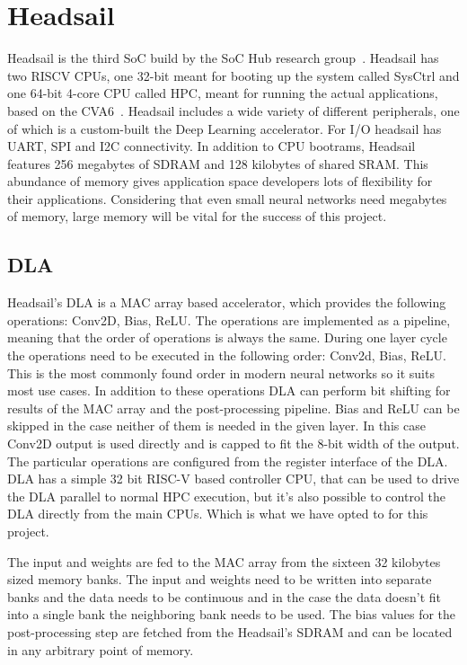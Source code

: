 \documentclass[12pt,a4paper,english
]{tunithesis}
\begin{document}
\section{Headsail}
Headsail is the third SoC build by the SoC Hub research group~\parencite{Ballast}. Headsail has two RISCV CPUs, one 32-bit meant for booting up the system called SysCtrl and one 64-bit 4-core CPU called HPC, meant for running the actual applications, based on the CVA6~\cite{zaruba2019costCVA6}.
Headsail includes a wide variety of different peripherals, one of which is a custom-built the Deep Learning accelerator.
For I/O headsail has UART, SPI and I2C connectivity.
In addition to CPU bootrams, Headsail features 256 megabytes of SDRAM and 128 kilobytes of shared SRAM. This abundance of memory gives application space developers lots of flexibility for their applications. Considering that even small neural networks need megabytes of memory, large memory will be vital for the success of this project.

\subsection{DLA}
Headsail's DLA is a MAC array based accelerator, which provides the following operations: Conv2D, Bias, ReLU. The operations are implemented as a pipeline, meaning that the order of operations is always the same. During one layer cycle the operations need to be executed in the following order: Conv2d, Bias, ReLU. This is the most commonly found order in modern neural networks so it suits most use cases. In addition to these operations DLA can perform bit shifting for results of the MAC array and the post-processing pipeline.
Bias and ReLU can be skipped in the case neither of them is needed in the given layer. In this case Conv2D output is used directly and is capped to fit the 8-bit width of the output.
The particular operations are configured from the register interface of the DLA.
DLA has a simple 32 bit RISC-V based controller CPU, that can be used to drive the DLA parallel to normal HPC execution, but it's also possible to control the DLA directly from the main CPUs. Which is what we have opted to for this project.

The input and weights are fed to the MAC array from the sixteen 32 kilobytes sized memory banks. The input and weights need to be written into separate banks and the data needs to be continuous and in the case the data doesn't fit into a single bank the neighboring bank needs to be used. The bias values for the post-processing step are fetched from the Headsail's SDRAM and can be located in any arbitrary point of memory.
\end{document}
